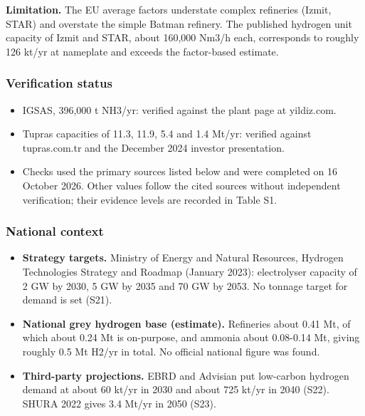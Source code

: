 \documentclass[11pt,a4paper]{article}
\begin{document}
\textbf{Limitation.} The EU average factors understate complex refineries (Izmit, STAR) and overstate the simple Batman refinery. The published hydrogen unit capacity of Izmit and STAR, about 160,000 Nm3/h each, corresponds to roughly 126 kt/yr at nameplate and exceeds the factor-based estimate.

\subsubsection{Verification status}

\begin{itemize}\setlength\itemsep{1pt}

  \item IGSAS, 396,000 t NH3/yr: verified against the plant page at yildiz.com.

  \item Tupras capacities of 11.3, 11.9, 5.4 and 1.4 Mt/yr: verified against tupras.com.tr and the December 2024 investor presentation.

  \item Checks used the primary sources listed below and were completed on 16 October 2026. Other values follow the cited sources without independent verification; their evidence levels are recorded in Table S1.

\end{itemize}

\subsubsection{National context}

\begin{itemize}\setlength\itemsep{1pt}

  \item \textbf{Strategy targets.} Ministry of Energy and Natural Resources, Hydrogen Technologies Strategy and Roadmap (January 2023): electrolyser capacity of 2 GW by 2030, 5 GW by 2035 and 70 GW by 2053. No tonnage target for demand is set (S21).

  \item \textbf{National grey hydrogen base (estimate).} Refineries about 0.41 Mt, of which about 0.24 Mt is on-purpose, and ammonia about 0.08-0.14 Mt, giving roughly 0.5 Mt H2/yr in total. No official national figure was found.

  \item \textbf{Third-party projections.} EBRD and Advisian put low-carbon hydrogen demand at about 60 kt/yr in 2030 and about 725 kt/yr in 2040 (S22). SHURA 2022 gives 3.4 Mt/yr in 2050 (S23).

\end{itemize}
\end{document}
